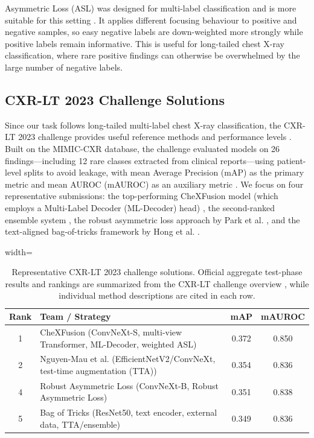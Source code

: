 Asymmetric Loss (ASL) was designed for multi-label classification and is more suitable for this setting \cite{ridnik2021asymmetric}. It applies different focusing behaviour to positive and negative samples, so easy negative labels are down-weighted more strongly while positive labels remain informative. This is useful for long-tailed chest X-ray classification, where rare positive findings can otherwise be overwhelmed by the large number of negative labels.

\subsection{CXR-LT 2023 Challenge Solutions}
\label{subsec:related_cxrlt_solutions}

Since our task follows long-tailed multi-label chest X-ray classification, the CXR-LT 2023 challenge provides useful reference methods and performance levels \cite{holste2024cxrlt}. Built on the MIMIC-CXR database, the challenge evaluated models on 26 findings—including 12 rare classes extracted from clinical reports—using patient-level splits to avoid leakage, with mean Average Precision (mAP) as the primary metric and mean AUROC (mAUROC) as an auxiliary metric \cite{holste2024cxrlt,PhysioNet-cxr-lt-iccv-workshop-cvamd-1.0.0}. We focus on four representative submissions: the top-performing CheXFusion model (which employs a Multi-Label Decoder (ML-Decoder) head) \cite{kim2023chexfusion}, the second-ranked ensemble system \cite{nguyenmau2023advanced}, the robust asymmetric loss approach by Park et al. \cite{park2023robust}, and the text-aligned bag-of-tricks framework by Hong et al. \cite{hong2023bagoftricks}.


\begin{table}[H]
    \centering
    \caption[Representative CXR-LT 2023 challenge solutions]{Representative CXR-LT 2023 challenge solutions. Official aggregate test-phase results and rankings are summarized from the CXR-LT challenge overview \cite{holste2024cxrlt}, while individual method descriptions are cited in each row.}
    \label{tab:cxrlt2023_results}
    \begin{adjustbox}{width=\textwidth}
    \begin{tabular}{clcc}
        \hline
        Rank & Team / Strategy & mAP & mAUROC \\
        \hline
        1 & CheXFusion \cite{kim2023chexfusion} (ConvNeXt-S, multi-view Transformer, ML-Decoder, weighted ASL) & 0.372 & 0.850 \\
        2 & Nguyen-Mau et al. \cite{nguyenmau2023advanced} (EfficientNetV2/ConvNeXt, test-time augmentation (TTA)) & 0.354 & 0.836 \\
        4 & Robust Asymmetric Loss \cite{park2023robust} (ConvNeXt-B, Robust Asymmetric Loss) & 0.351 & 0.838 \\
        5 & Bag of Tricks \cite{hong2023bagoftricks} (ResNet50, text encoder, external data, TTA/ensemble) & 0.349 & 0.836 \\
        \hline
    \end{tabular}
    \end{adjustbox}
\end{table}

